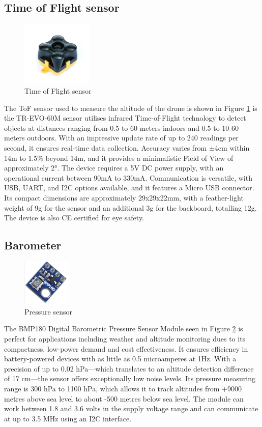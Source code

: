 \documentclass{report}
\begin{document}
\subsection{Time of Flight sensor}
\begin{figure}[H]
  \centering
  \includegraphics[width=0.3\textwidth]{Pictures/ToF_sensor.png}
  \caption{Time of Flight sensor}
  \label{fig:ToF}
\end{figure}
The ToF sensor used to measure the altitude of the drone is shown in Figure
\ref{fig:ToF} is the TR-EVO-60M sensor utilises infrared Time-of-Flight
technology to detect objects at distances ranging from 0.5 to 60 meters indoors
and 0.5 to 10-60 meters outdoors. With an impressive update rate of up to 240
readings per second, it ensures real-time data collection. Accuracy varies from
±4cm within 14m to 1.5\% beyond 14m, and it provides a minimalistic Field of
View of approximately 2°. The device requires a 5V DC power supply, with an
operational current between 90mA to 330mA. Communication is versatile, with USB,
UART, and I2C options available, and it features a Micro USB connector. Its
compact dimensions are approximately 29x29x22mm, with a feather-light weight of
9g for the sensor and an additional 3g for the backboard, totalling 12g. The
device is also CE certified for eye safety.

\subsection{Barometer}
\begin{figure}[H]
  \centering
  \includegraphics[width=0.2\textwidth]{Pictures/bmp180.png}
  \caption{Pressure sensor}
  \label{fig:bmp180}
\end{figure}
The BMP180 Digital Barometric Pressure Sensor Module seen in Figure
\ref{fig:bmp180} is perfect for applications including weather and altitude
monitoring dues to its compactness, low-power demand and cost effectiveness. It
ensures efficiency in battery-powered devices with as little as 0.5 microamperes
at 1Hz. With a precision of up to 0.02 hPa—which translates to an altitude
detection difference of 17 cm—the sensor offers exceptionally low noise levels.
Its pressure measuring range is 300 hPa to 1100 hPa, which allows it to track
altitudes from +9000 metres above sea level to about -500 metres below sea
level. The module can work between 1.8 and 3.6 volts in the supply voltage range
and can communicate at up to 3.5 MHz using an I2C interface.
\end{document}
